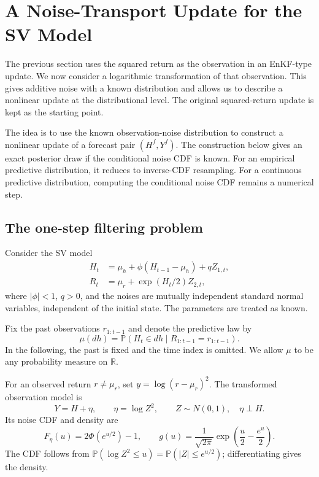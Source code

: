 \section{A Noise-Transport Update for the SV Model}

The previous section uses the squared return as the observation in an
EnKF-type update. We now consider a logarithmic transformation of that
observation. This gives additive noise with a known distribution and
allows us to describe a nonlinear update at the distributional level.
The original squared-return update is kept as the starting point.

\noindent
The idea is to use the known observation-noise distribution to construct
a nonlinear update of a forecast pair $(H^f,Y^f)$. The construction below
gives an exact posterior draw if the conditional noise CDF is known.
For an empirical predictive distribution, it reduces to inverse-CDF
resampling. For a continuous predictive distribution, computing the
conditional noise CDF remains a numerical step.

\subsection{The one-step filtering problem}

Consider the SV model
\begin{align*}
H_t&=\mu_h+\phi(H_{t-1}-\mu_h)+qZ_{1,t},\\
R_t&=\mu_r+\exp(H_t/2)Z_{2,t},
\end{align*}
where $|\phi|<1$, $q>0$, and the noises are mutually independent
standard normal variables, independent of the initial state.
The parameters are treated as known.

Fix the past observations $r_{1:t-1}$ and denote the predictive law by
\[
\mu(dh)=\mathbb P(H_t\in dh\mid R_{1:t-1}=r_{1:t-1}).
\]
In the following, the past is fixed and the time index is omitted.
We allow $\mu$ to be any probability measure on $\mathbb R$.

For an observed return $r\ne\mu_r$, set $y=\log(r-\mu_r)^2$. The
transformed observation model is
\[
Y=H+\eta,\qquad \eta=\log Z^2,\qquad Z\sim N(0,1),\quad \eta\perp H.
\]
Its noise CDF and density are
\begin{equation}
F_\eta(u)=2\Phi(e^{u/2})-1,\qquad
g(u)=\frac{1}{\sqrt{2\pi}}
\exp\left(\frac u2-\frac{e^u}{2}\right).
\label{eq:noise-transport:noise}
\end{equation}
The CDF follows from $\mathbb P(\log Z^2\le u)=\mathbb P(|Z|\le e^{u/2})$;
differentiating gives the density.

